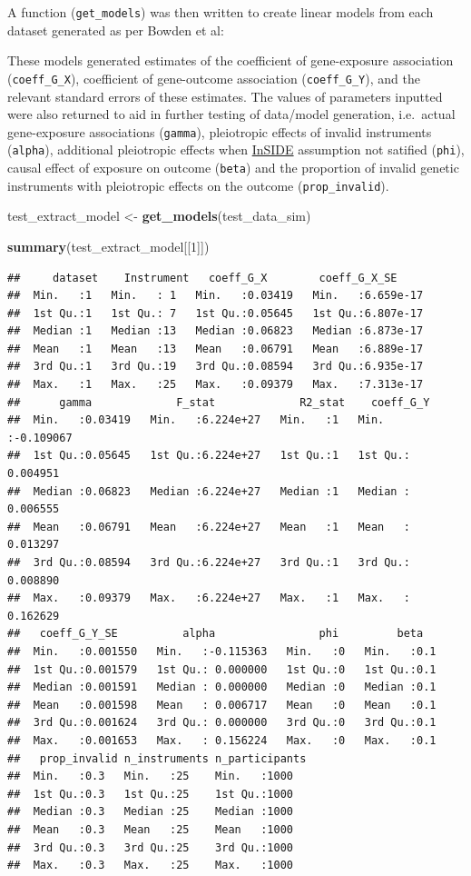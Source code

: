 \documentclass[
]{article}
\newenvironment{Shaded}{\begin{snugshade}}{\end{snugshade}}
\newcommand{\DecValTok}[1]{\textcolor[rgb]{0.00,0.00,0.81}{#1}}
\newcommand{\FunctionTok}[1]{\textcolor[rgb]{0.13,0.29,0.53}{\textbf{#1}}}
\newcommand{\NormalTok}[1]{#1}
\newcommand{\OtherTok}[1]{\textcolor[rgb]{0.56,0.35,0.01}{#1}}
\begin{document}
A function (\texttt{get\_models}) was then written to create linear models from each dataset generated as per Bowden et al:

These models generated estimates of the coefficient of gene-exposure association (\texttt{coeff\_G\_X}), coefficient of gene-outcome association (\texttt{coeff\_G\_Y}), and the relevant standard errors of these estimates. The values of parameters inputted were also returned to aid in further testing of data/model generation, i.e.~actual gene-exposure associations (\texttt{gamma}), pleiotropic effects of invalid instruments (\texttt{alpha}), additional pleiotropic effects when \hyperref[acronyms_InSIDE]{InSIDE} assumption not satified (\texttt{phi}), causal effect of exposure on outcome (\texttt{beta}) and the proportion of invalid genetic instruments with pleiotropic effects on the outcome (\texttt{prop\_invalid}).

\begin{Shaded}
\begin{Highlighting}[]
\NormalTok{test\_extract\_model }\OtherTok{\textless{}{-}} \FunctionTok{get\_models}\NormalTok{(test\_data\_sim)}

\FunctionTok{summary}\NormalTok{(test\_extract\_model[[}\DecValTok{1}\NormalTok{]])}
\end{Highlighting}
\end{Shaded}

\begin{verbatim}
##     dataset    Instrument   coeff_G_X        coeff_G_X_SE      
##  Min.   :1   Min.   : 1   Min.   :0.03419   Min.   :6.659e-17  
##  1st Qu.:1   1st Qu.: 7   1st Qu.:0.05645   1st Qu.:6.807e-17  
##  Median :1   Median :13   Median :0.06823   Median :6.873e-17  
##  Mean   :1   Mean   :13   Mean   :0.06791   Mean   :6.889e-17  
##  3rd Qu.:1   3rd Qu.:19   3rd Qu.:0.08594   3rd Qu.:6.935e-17  
##  Max.   :1   Max.   :25   Max.   :0.09379   Max.   :7.313e-17  
##      gamma             F_stat             R2_stat    coeff_G_Y        
##  Min.   :0.03419   Min.   :6.224e+27   Min.   :1   Min.   :-0.109067  
##  1st Qu.:0.05645   1st Qu.:6.224e+27   1st Qu.:1   1st Qu.: 0.004951  
##  Median :0.06823   Median :6.224e+27   Median :1   Median : 0.006555  
##  Mean   :0.06791   Mean   :6.224e+27   Mean   :1   Mean   : 0.013297  
##  3rd Qu.:0.08594   3rd Qu.:6.224e+27   3rd Qu.:1   3rd Qu.: 0.008890  
##  Max.   :0.09379   Max.   :6.224e+27   Max.   :1   Max.   : 0.162629  
##   coeff_G_Y_SE          alpha                phi         beta    
##  Min.   :0.001550   Min.   :-0.115363   Min.   :0   Min.   :0.1  
##  1st Qu.:0.001579   1st Qu.: 0.000000   1st Qu.:0   1st Qu.:0.1  
##  Median :0.001591   Median : 0.000000   Median :0   Median :0.1  
##  Mean   :0.001598   Mean   : 0.006717   Mean   :0   Mean   :0.1  
##  3rd Qu.:0.001624   3rd Qu.: 0.000000   3rd Qu.:0   3rd Qu.:0.1  
##  Max.   :0.001653   Max.   : 0.156224   Max.   :0   Max.   :0.1  
##   prop_invalid n_instruments n_participants
##  Min.   :0.3   Min.   :25    Min.   :1000  
##  1st Qu.:0.3   1st Qu.:25    1st Qu.:1000  
##  Median :0.3   Median :25    Median :1000  
##  Mean   :0.3   Mean   :25    Mean   :1000  
##  3rd Qu.:0.3   3rd Qu.:25    3rd Qu.:1000  
##  Max.   :0.3   Max.   :25    Max.   :1000
\end{verbatim}
\end{document}
